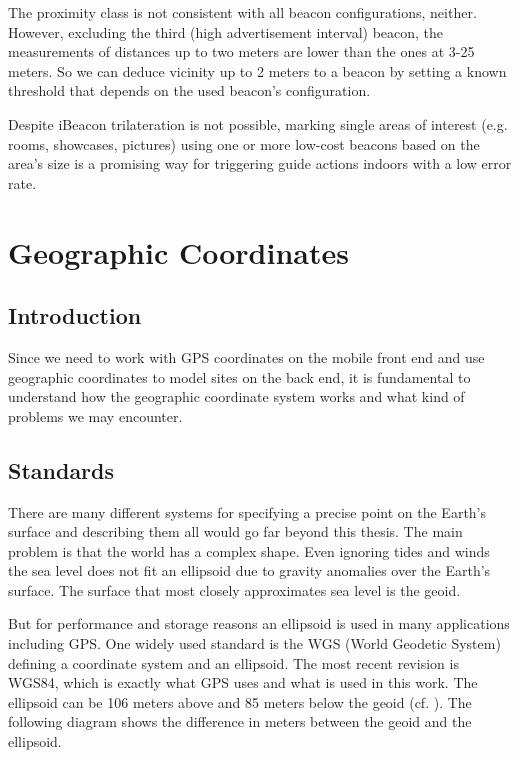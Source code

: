 The proximity class is not consistent with all beacon configurations, neither. However, excluding the third (high advertisement interval) beacon, the measurements of distances up to two meters are lower than the ones at 3-25 meters. So we can deduce vicinity up to 2 meters to a beacon by setting a known threshold that depends on the used beacon's configuration.

Despite iBeacon trilateration is not possible, marking single areas of interest (e.g. rooms, showcases, pictures) using one or more low-cost beacons based on the area's size is a promising way for triggering guide actions indoors with a low error rate. 


\section{Geographic Coordinates}

\subsection{Introduction}

Since we need to work with GPS coordinates on the mobile front end and use geographic coordinates to model sites on the back end, it is fundamental to understand how the geographic coordinate system works and what kind of problems we may encounter.

\subsection{Standards}

There are many different systems for specifying a precise point on the Earth's surface and describing them all would go far beyond this thesis. The main problem is that the world has a complex shape. Even ignoring tides and winds the sea level does not fit an ellipsoid due to gravity anomalies over the Earth's surface. The surface that most closely approximates sea level is the geoid. 

But for performance and storage reasons an ellipsoid is used in many applications including GPS. One widely used standard is the WGS (World Geodetic System) defining a coordinate system and an ellipsoid. The most recent revision is WGS84, which is exactly what GPS uses and what is used in this work. The ellipsoid can be 106 meters above and 85 meters below the geoid (cf. \cite{geoid}). The following diagram shows the difference in meters between the geoid and the ellipsoid.

